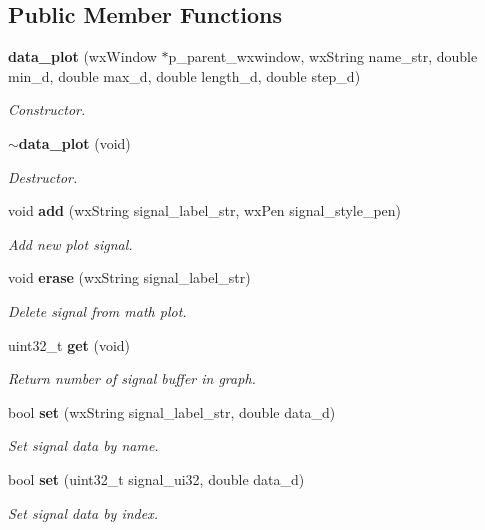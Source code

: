 \subsection*{Public Member Functions}
\begin{DoxyCompactItemize}
\item 
\textbf{ data\+\_\+plot} (wx\+Window $\ast$p\+\_\+parent\+\_\+wxwindow, wx\+String name\+\_\+str, double min\+\_\+d, double max\+\_\+d, double length\+\_\+d, double step\+\_\+d)
\begin{DoxyCompactList}\small\item\em Constructor. \end{DoxyCompactList}\item 
\textbf{ $\sim$data\+\_\+plot} (void)
\begin{DoxyCompactList}\small\item\em Destructor. \end{DoxyCompactList}\item 
void \textbf{ add} (wx\+String signal\+\_\+label\+\_\+str, wx\+Pen signal\+\_\+style\+\_\+pen)
\begin{DoxyCompactList}\small\item\em Add new plot signal. \end{DoxyCompactList}\item 
void \textbf{ erase} (wx\+String signal\+\_\+label\+\_\+str)
\begin{DoxyCompactList}\small\item\em Delete signal from math plot. \end{DoxyCompactList}\item 
uint32\+\_\+t \textbf{ get} (void)
\begin{DoxyCompactList}\small\item\em Return number of signal buffer in graph. \end{DoxyCompactList}\item 
bool \textbf{ set} (wx\+String signal\+\_\+label\+\_\+str, double data\+\_\+d)
\begin{DoxyCompactList}\small\item\em Set signal data by name. \end{DoxyCompactList}\item 
bool \textbf{ set} (uint32\+\_\+t signal\+\_\+ui32, double data\+\_\+d)
\begin{DoxyCompactList}\small\item\em Set signal data by index. \end{DoxyCompactList}\item 

\end{DoxyCompactItemize}
